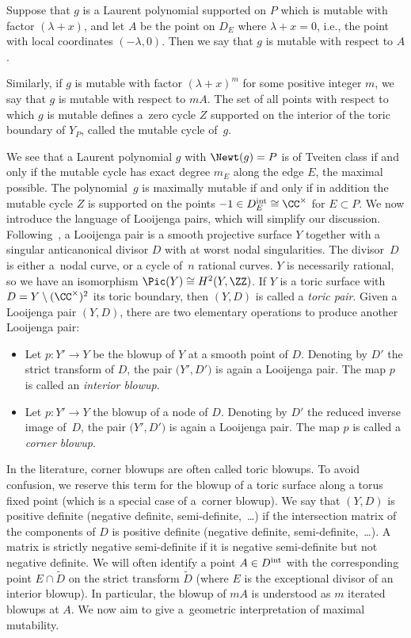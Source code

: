 	\begin{Definition}\label{def:mutablecycle}
		Suppose that $g$ is a Laurent polynomial supported on $P$ which is mutable with factor $(\lambda +x)$, and let $A$ be the point on $D_E$ where $\lambda+x=0$, i.e., the point with local coordinates $(-\lambda, 0)$. Then we say that $g$ is mutable with respect to $A$.

		Similarly, if $g$ is mutable with factor $(\lambda+x)^m$ for some positive integer $m$, we say that $g$ is mutable with respect to $m A$.
		The set of all points with respect to which $g$ is mutable defines a~zero cycle $Z$ supported on the interior of the toric boundary of $Y_P$, called the mutable cycle of~$g$.
	\end{Definition}
	We see that a Laurent polynomial $g$ with $\Newt(g)=P$ is of Tveiten class if and only if the mutable cycle has exact degree $m_E$ along the edge $E$, the maximal possible. The polynomial~$g$ is maximally mutable if and only if in addition the mutable cycle $Z$ is supported on the points $-1 \in D_E^{\rm int} \cong \CC^\times$ for $E \subset P$.
We now introduce the language of Looijenga pairs, which will simplify our discussion.
Following~\cite{Friedman, GrossHackingKeelLooijengapairs}, a Looijenga pair is a smooth projective surface $Y$ together with a singular anticanonical divisor $D$ with at worst nodal singularities. The divisor~$D$ is either a~nodal curve, or a cycle of~$n$ rational curves. $Y$ is necessarily rational, so we have an isomorphism $\Pic(Y) \cong H^2(Y, \ZZ)$.
If $Y$ is a toric surface with $D=Y \setminus (\CC^\times)^2$ its toric boundary, then $(Y,D)$ is called a {\it toric pair}.
Given a Looijenga pair $(Y, D)$, there are two elementary operations to produce another Looijenga pair:
\begin{itemize}\itemsep=0pt
	\item
	Let $p \colon Y' \rightarrow Y$ be the blowup of $Y$ at a smooth point of $D$. Denoting by $D'$ the strict transform of $D$, the pair $\bigl(Y', D'\bigr)$ is again a Looijenga pair. The map $p$ is called an \emph{interior blowup}.
	\item
	Let $p \colon Y' \rightarrow Y$ the blowup of a node of $D$. Denoting by $D'$ the reduced inverse image of~$D$, the pair $\bigl(Y', D'\bigr)$ is again a Looijenga pair. The map $p$ is called a \emph{corner blowup}.
\end{itemize}
	In the literature, corner blowups are often called toric blowups. To avoid confusion, we reserve this term for the blowup of a toric surface along a torus fixed point (which is a special case of a~corner blowup).
	We say that $(Y, D)$ is positive definite (negative definite, semi-definite,~\dots) if the intersection matrix of the components of $D$ is positive definite (negative definite, semi-definite,~\dots). A matrix is strictly negative semi-definite if it is negative semi-definite but not negative definite.
We will often identify a point $A \in D^{\rm int}$ with the corresponding point $E \cap \tilde{D}$ on the strict transform $\tilde{D}$ (where $E$ is the exceptional divisor of an interior blowup). In particular, the blowup of $m A$ is understood as $m$ iterated blowups at $A$.
We now aim to give a~geometric interpretation of maximal mutability.

